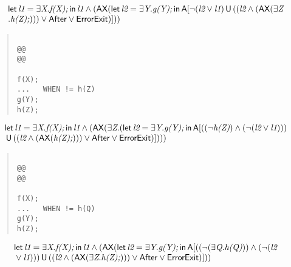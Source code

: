 \documentclass{article}
\newcommand{\U}{\,\mbox{\sf{U}}\,}
\newcommand{\A}{\mbox{\sf{A}}}
\newcommand{\AX}{\mbox{\sf{AX}}}
\newcommand{\mita}[1]{\mbox{\it{{#1}}}}
\newcommand{\msf}[1]{\mbox{\sf{{#1}}}}
\begin{document}
\[\begin{array}{l}
\mita{\sf{let}} \, \mita{l1} = \exists \mita{X} . \mita{f(X);} \, \mita{\sf{in}} \, \mita{l1} \wedge (\AX(\mita{\sf{let}} \, \mita{l2} = \exists \mita{Y} . \mita{g(Y);} \, \mita{\sf{in}} \, \A[\neg (\mita{l2} \vee \mita{l1}) \U ((\mita{l2} \wedge (\AX(\exists \mita{Z}\\\mbox{} . \mita{h(Z);}))) \vee \msf{After} \vee \msf{ErrorExit})]

))

\end{array}\]

\begin{quote}\begin{verbatim}

@@
@@

f(X);
...   WHEN != h(Z)
g(Y);
h(Z);
\end{verbatim}\end{quote}

\[\begin{array}{l}
\mita{\sf{let}} \, \mita{l1} = \exists \mita{X} . \mita{f(X);} \, \mita{\sf{in}} \, \mita{l1} \wedge (\AX(\exists \mita{Z} . (\mita{\sf{let}} \, \mita{l2} = \exists \mita{Y} . \mita{g(Y);} \, \mita{\sf{in}} \, \A[((\neg \mita{h(Z)}) \wedge (\neg (\mita{l2} \vee \mita{l1})))\\\mbox{} \U ((\mita{l2} \wedge (\AX(\mita{h(Z);}))) \vee \msf{After} \vee \msf{ErrorExit})]

)))

\end{array}\]

\begin{quote}\begin{verbatim}

@@
@@

f(X);
...   WHEN != h(Q)
g(Y);
h(Z);
\end{verbatim}\end{quote}

\[\begin{array}{l}
\mita{\sf{let}} \, \mita{l1} = \exists \mita{X} . \mita{f(X);} \, \mita{\sf{in}} \, \mita{l1} \wedge (\AX(\mita{\sf{let}} \, \mita{l2} = \exists \mita{Y} . \mita{g(Y);} \, \mita{\sf{in}} \, \A[((\neg (\exists \mita{Q} . \mita{h(Q)})) \wedge (\neg (\mita{l2}\\\mbox{} \vee \mita{l1}))) \U ((\mita{l2} \wedge (\AX(\exists \mita{Z} . \mita{h(Z);}))) \vee \msf{After} \vee \msf{ErrorExit})]

))

\end{array}\]
\end{document}
